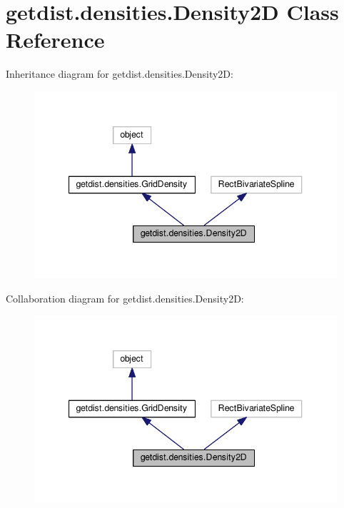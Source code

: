 \hypertarget{classgetdist_1_1densities_1_1Density2D}{}\section{getdist.\+densities.\+Density2D Class Reference}
\label{classgetdist_1_1densities_1_1Density2D}


Inheritance diagram for getdist.\+densities.\+Density2D\+:
\nopagebreak
\begin{figure}[H]
\begin{center}
\leavevmode
\includegraphics[width=343pt]{classgetdist_1_1densities_1_1Density2D__inherit__graph}
\end{center}
\end{figure}


Collaboration diagram for getdist.\+densities.\+Density2D\+:
\nopagebreak
\begin{figure}[H]
\begin{center}
\leavevmode
\includegraphics[width=343pt]{classgetdist_1_1densities_1_1Density2D__coll__graph}
\end{center}
\end{figure}

